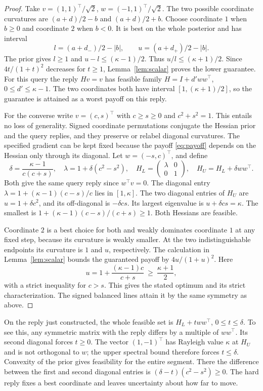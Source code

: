 \documentclass[11pt]{article}
\begin{document}
\begin{proof}
Take \(v=(1,1)^\top/\sqrt2\), \(w=(-1,1)^\top/\sqrt2\).
The two possible coordinate curvatures are
\((a+d)/2-b\) and \((a+d)/2+b\). Choose coordinate \(1\) when
\(b\ge0\) and coordinate \(2\) when \(b<0\). It is best on the
whole posterior and has interval
\[
 l=(a+d_-)/2-|b|,\qquad u=(a+d_+)/2-|b|.
\]
The prior gives \(l\ge1\) and \(u-l\le(\kappa-1)/2\). Thus
\(u/l\le(\kappa+1)/2\). Since \(4t/(1+t)^2\) decreases for
\(t\ge1\), Lemma~\ref{lem:scalar} proves the lower guarantee.
For this query the reply \(Hv=v\) has feasible family
\(H=I+d'ww^\top\), \(0\le d'\le\kappa-1\). The two coordinates
both have interval \([1,(\kappa+1)/2]\), so the guarantee is attained
as a worst payoff on this reply.

For the converse write \(v=(c,s)^\top\) with \(c\ge s\ge0\) and
\(c^2+s^2=1\). This entails no loss of generality. Signed coordinate
permutations conjugate the Hessian prior and the query replies, and
they preserve or relabel diagonal curvatures. The specified gradient
can be kept fixed because the payoff \eqref{eq:payoff} depends on the
Hessian only through its diagonal. Let \(w=(-s,c)^\top\), and define
\[
 \delta=\frac{\kappa-1}{c(c+s)},\quad
 \lambda=1+\delta(c^2-s^2),\quad
 H_L=\begin{pmatrix}\lambda&0\\0&1\end{pmatrix},\quad
 H_U=H_L+\delta ww^\top .
\]
Both give the same query reply since \(w^\top v=0\). The diagonal
entry \(\lambda=1+(\kappa-1)(c-s)/c\) lies in \([1,\kappa]\).
The two diagonal entries of \(H_U\) are
\(u=1+\delta c^2\), and its off-diagonal is \(-\delta cs\).
Its largest eigenvalue is \(u+\delta cs=\kappa\). The smallest is
\(1+(\kappa-1)(c-s)/(c+s)\ge1\). Both Hessians are feasible.

Coordinate \(2\) is a best choice for both and weakly dominates
coordinate \(1\) at any fixed step, because its curvature is weakly
smaller. At the two indistinguishable endpoints its curvature is \(1\)
and \(u\), respectively. The calculation in Lemma~\ref{lem:scalar}
bounds the guaranteed payoff by \(4u/(1+u)^2\). Here
\[
 u=1+\frac{(\kappa-1)c}{c+s}\ \ge\ \frac{\kappa+1}{2},
\]
with a strict inequality for \(c>s\). This gives the stated optimum
and its strict characterization. The signed balanced lines attain it
by the same symmetry as above.
\end{proof}

On the reply just constructed, the whole feasible set is
\(H_L+tww^\top\), \(0\le t\le\delta\). To see this, any symmetric
matrix with the reply differs by a multiple of \(ww^\top\). Its
second diagonal forces \(t\ge0\). The vector \((1,-1)^\top\) has
Rayleigh value \(\kappa\) at \(H_U\) and is not orthogonal to \(w\);
the upper spectral bound therefore forces \(t\le\delta\).
Convexity of the prior gives feasibility for the entire segment.
There the difference between the first and second diagonal entries
is \((\delta-t)(c^2-s^2)\ge0\). The hard reply fixes a best coordinate
and leaves uncertainty about how far to move.
\end{document}
